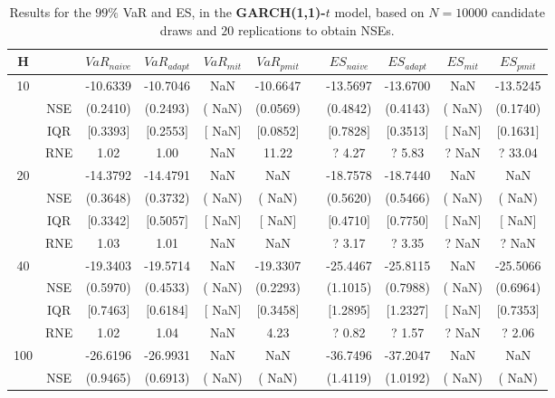 \footnotesize{  
{ \renewcommand{\arraystretch}{1.3} 
\begin{longtable}{ccccccccccc}  
\caption{Results for the $99\%$ VaR and ES, in the \textbf{GARCH(1,1)-$t$} model, based on $N=10000$ candidate draws and $20$ replications to obtain NSEs.} 
\label{tab:res_algos_t_garch2_noS} \\ 
 H & & $VaR_{naive}$ & $VaR_{adapt}$ & $VaR_{mit}$  & $VaR_{pmit}$ &  & $ES_{naive}$ & $ES_{adapt}$ & $ES_{mit}$ & $ES_{pmit}$ \\ \hline 
10 & & -10.6339 & -10.7046 &    NaN & -10.6647 & & -13.5697 & -13.6700 &    NaN & -13.5245  \\ 
  & NSE & (0.2410) & (0.2493) & (   NaN) & (0.0569) & & (0.4842) & (0.4143) & (   NaN) & (0.1740)   \\ 
 & IQR & $[$0.3393$]$ & $[$0.2553$]$ & $[$   NaN$]$ & $[$0.0852$]$ & & $[$0.7828$]$ & $[$0.3513$]$  &$[$   NaN$]$ & $[$0.1631$]$  \\  
  & RNE &   1.02 &   1.00 &    NaN &  11.22 &  &?   4.27 & ?   5.83 &  ?    NaN & ?  33.04   \\ [1ex] 
20 & & -14.3792 & -14.4791 &    NaN &    NaN & & -18.7578 & -18.7440 &    NaN &    NaN  \\ 
  & NSE & (0.3648) & (0.3732) & (   NaN) & (   NaN) & & (0.5620) & (0.5466) & (   NaN) & (   NaN)   \\ 
 & IQR & $[$0.3342$]$ & $[$0.5057$]$ & $[$   NaN$]$ & $[$   NaN$]$ & & $[$0.4710$]$ & $[$0.7750$]$  &$[$   NaN$]$ & $[$   NaN$]$  \\  
  & RNE &   1.03 &   1.01 &    NaN &    NaN &  &?   3.17 & ?   3.35 &  ?    NaN & ?    NaN   \\ [1ex] 
40 & & -19.3403 & -19.5714 &    NaN & -19.3307 & & -25.4467 & -25.8115 &    NaN & -25.5066  \\ 
  & NSE & (0.5970) & (0.4533) & (   NaN) & (0.2293) & & (1.1015) & (0.7988) & (   NaN) & (0.6964)   \\ 
 & IQR & $[$0.7463$]$ & $[$0.6184$]$ & $[$   NaN$]$ & $[$0.3458$]$ & & $[$1.2895$]$ & $[$1.2327$]$  &$[$   NaN$]$ & $[$0.7353$]$  \\  
  & RNE &   1.02 &   1.04 &    NaN &   4.23 &  &?   0.82 & ?   1.57 &  ?    NaN & ?   2.06   \\ [1ex] 
100 & & -26.6196 & -26.9931 &    NaN &    NaN & & -36.7496 & -37.2047 &    NaN &    NaN  \\ 
  & NSE & (0.9465) & (0.6913) & (   NaN) & (   NaN) & & (1.4119) & (1.0192) & (   NaN) & (   NaN)   \\ 

\end{longtable}}}
